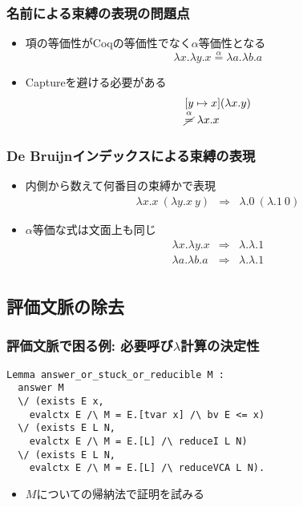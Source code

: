 \documentclass[dvipdfmx,cjk,xcolor=dvipsnames,envcountsect,notheorems,12pt]{beamer}
\theoremstyle{definition}
\begin{document}
\begin{frame}
	\frametitle{名前による束縛の表現の問題点}
	\begin{itemize}
		\item 項の等価性がCoqの等価性でなく\mbox{$\alpha$等価性}となる
			\[ \lambda x.\lambda y.x \overset{\alpha}{=} \lambda a.\lambda b.a \]
		\item Captureを避ける必要がある
			\[\begin{array}{l}
				[y \mapsto x](\lambda x.y) \\
				\overset{\alpha}{\cancel{=}}~\lambda x.x
			\end{array}\]
	\end{itemize}
\end{frame}

\begin{frame}
	\frametitle{De Bruijnインデックスによる束縛の表現}
	\begin{itemize}
		\item 内側から数えて何番目の束縛かで表現
			{\LARGE \[\begin{array}{lcl}
				\lambda x.x~(\lambda y.x~y) & \Rightarrow & \lambda.0~(\lambda.1~0)
			\end{array}\]}
		\item $\alpha$等価な式は文面上も同じ
			{\LARGE \[\begin{array}{lcl}
				\lambda x.\lambda y.x & \Rightarrow & \lambda.\lambda.1 \\
				\lambda a.\lambda b.a & \Rightarrow & \lambda.\lambda.1 \\
			\end{array}\]}
	\end{itemize}
\end{frame}

\subsection{評価文脈の除去}

\begin{frame}[fragile]
	\frametitle{評価文脈で困る例: 必要呼び$\lambda$計算の決定性}
\begin{lstlisting}
Lemma answer_or_stuck_or_reducible M :
  answer M
  \/ (exists E x,
    evalctx E /\ M = E.[tvar x] /\ bv E <= x)
  \/ (exists E L N,
    evalctx E /\ M = E.[L] /\ reduceI L N)
  \/ (exists E L N,
    evalctx E /\ M = E.[L] /\ reduceVCA L N).
\end{lstlisting}
	\begin{itemize}
		\item $M$についての帰納法で証明を試みる
	\end{itemize}
\end{frame}
\end{document}
